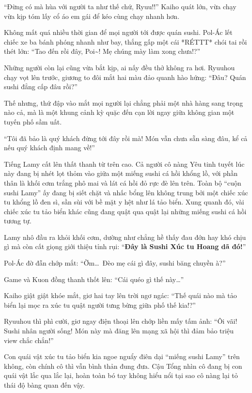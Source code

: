 \documentclass[../main.tex]{subfiles}
\begin{document}
``Đừng có mà hùa với người ta như thế chứ, Ryuu!!'' Kaiho quát lớn, vừa chạy vừa kịp tóm lấy cổ áo em gái để kéo cùng chạy nhanh hơn.

\ct

Không mất quá nhiều thời gian để mọi người tới được quán sushi. Pol-Ác lết chiếc xe ba bánh phóng nhanh như bay, thắng gấp một cái *RÉTTT* chói tai rồi thét lớn: ``Tao đến rồi đây, Poi\~{}! Mẹ chúng mày làm xong chưa!?''

Những người còn lại cũng vừa bắt kịp, ai nấy đều thở không ra hơi. Ryuuhou chạy vọt lên trước, giương to đôi mắt hai màu đảo quanh hào hứng: ``Đâu? Quán sushi đẳng cấp đâu rồi?''

Thế nhưng, thứ đập vào mắt mọi người lại chẳng phải một nhà hàng sang trọng nào cả, mà là một khung cảnh kỳ quặc đến cạn lời ngay giữa không gian một tuyến phố sầm uất.

``Tôi đã bảo là quý khách đừng tới đây rồi mà! Món vẫn chưa sẵn sàng đâu, kể cả nếu quý khách định mang về!''

Tiếng Lamy cất lên thất thanh từ trên cao. Cả người cô nàng Yêu tinh tuyết lúc này đang bị nhét lọt thỏm vào giữa một miếng sushi cá hồi khổng lồ, với phần thân là khối cơm trắng phô mai và lát cá hồi đỏ rực đè lên trên. Toàn bộ ``cuộn sushi Lamy'' ấy đang bị siết chặt và nhấc bổng lên không trung bởi một chiếc xúc tu khổng lồ đen sì, sần sùi với bề mặt y hệt như lá tảo biển. Xung quanh đó, vài chiếc xúc tu tảo biển khác cũng đang quật qua quật lại những miếng sushi cá hồi tương tự.


Lamy nhô đầu ra khỏi khối cơm, dường như chẳng hề thấy đau đớn hay khó chịu gì mà còn cất giọng giới thiệu tỉnh rụi: ``\textbf{Đây là Sushi Xúc tu Hoang dã đó!}''

Pol-Ác đờ đẫn chớp mắt: ``Ờm\dots\ Đèo mẹ cái gì đây, sushi băng chuyền à?''

Game và Kuon đồng thanh thốt lên: ``Cái quéo gì thế này\dots''

Kaiho giật giật khóe mắt, giơ hai tay lên trời ngơ ngác: ``Thế quái nào mà tảo biển lại mọc ra xúc tu quật người tưng bừng giữa phố thế kia!?''

Ryuuhou thì phì cười, giơ ngay điện thoại lên chớp liền mấy tấm ảnh: ``Ôi vãi! Sushi nhân người sống! Món này mà đăng lên mạng xã hội thì đảm bảo triệu view chắc chắn!''

Con quái vật xúc tu tảo biển kia ngoe nguẩy điên dại ``miếng sushi Lamy'' trên không, còn chính cô thì vẫn bình thản đung đưa. Cậu Tổng nhìn cô đang bị con quái vật lắc qua lắc lại, hoàn toàn bó tay không hiểu nổi tại sao cô nàng lại tỏ thái độ bàng quan đến vậy.
\end{document}
